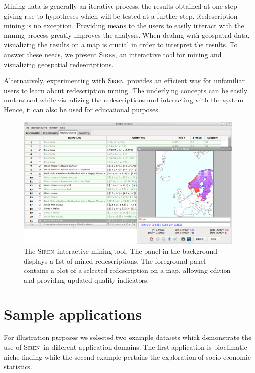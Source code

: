 \documentclass{sig-alternate}
\newcommand{\Siren}{\textsc{Siren}}
\begin{document}
Mining data is generally an iterative process, the results obtained at
one step giving rise to hypotheses which will be tested at a further
step.  Redescription mining is no exception. Providing means to the
users to easily interact with the mining process greatly improves the
analysis.  When dealing with geospatial data, visualizing the results
on a map is crucial in order to interpret the results.  To answer
these needs, we present \Siren, an interactive tool for mining and
visualizing geospatial redescriptions.  

Alternatively, experimenting with \Siren\ provides an efficient way
for unfamiliar users to learn about redescription mining. The
underlying concepts can be easily understood while visualizing the
redescriptions and interacting with the system. Hence, it can also be
used for educational purposes.


\begin{figure}[t]
  \centering
\includegraphics[width=\textwidth]{screenshots/both_panels_02.png}
  \caption{The \Siren\ interactive mining tool. The panel in the background displays a list of mined redescriptions. The foreground panel contains a plot of a selected redescription on a map, allowing edition and providing updated quality indicators.}
  \label{fig:both_panels}
\end{figure}

\section{Sample applications}
For illustration purposes we selected two example datasets which
demonstrate the use of \Siren\ in different application domains.  The
first application is bioclimatic niche-finding while the second example
pertains the exploration of socio-economic statistics.
\end{document}
